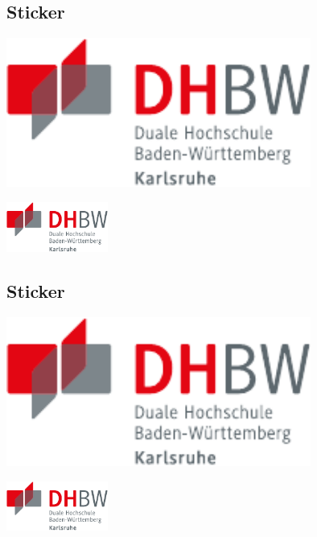 \subsection{Sticker}
\begin{frame}{\subsecname}

  \begin{sticker}[0]
    \includegraphics[width=0.75\textwidth]{DHBW.pdf}
  \end{sticker}

  \begin{sidesticker}[0]
    \includegraphics[width=0.25\textwidth]{DHBW.pdf}
  \end{sidesticker}

\end{frame}

\subsection{Sticker}
\begin{frame}{\subsecname}

  \begin{sticker}[-1]
    \includegraphics[width=0.75\textwidth]{DHBW.pdf}
  \end{sticker}

  \begin{sidesticker}[+1]
    \includegraphics[width=0.25\textwidth]{DHBW.pdf}
  \end{sidesticker}

\end{frame}


